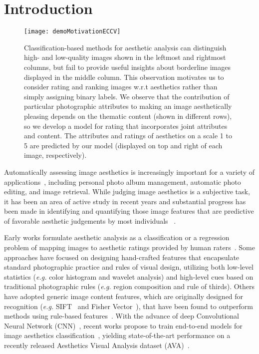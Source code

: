\documentclass[runningheads]{llncs}
\def\eg{\emph{e.g. }}
\begin{document}
\section{Introduction}
\label{sec:intro}

\begin{figure}
\centering
\texttt{[image: demoMotivationECCV]}
\caption{Classification-based methods for aesthetic analysis can distinguish
   high- and low-quality images shown in the leftmost and rightmost columns, but fail to
   provide useful insights about borderline images displayed in the middle column.
   This observation motivates us to consider rating and ranking images w.r.t
   aesthetics rather than simply assigning binary labels. We observe that the
   contribution of particular photographic attributes to making an image
   aesthetically pleasing depends on the thematic content (shown in different
   rows), so we develop a model for rating that incorporates joint
   attributes and content.  The attributes and ratings of aesthetics on a scale 1 to 5
   are predicted by our model (displayed on top and right of each image, respectively).
   }
\vspace{-7mm}
\label{fig:motivation}
\end{figure}

Automatically assessing image aesthetics is increasingly important for a variety of applications~\cite{marchesotti2014discovering,xin2015iccv},
including personal photo album management, automatic photo editing, and image retrieval.
While judging image aesthetics is a subjective task,
it has been an area of active study in recent years and substantial progress has been made
in identifying and quantifying those image features that are predictive of favorable aesthetic judgements by most individuals
~\cite{marchesotti2014discovering,xin2015iccv,lu2014rapid,luo2011content,datta2006studying}.

Early works formulate aesthetic analysis as a classification or a regression
problem of mapping images to aesthetic ratings provided by human
raters~\cite{datta2006studying,ke2006design,luo2011content,dhar2011high,nishiyama2011aesthetic}.
Some approaches have focused on designing hand-crafted features that encapsulate standard
photographic practice and rules of visual design, utilizing both low-level statistics (\eg color histogram and wavelet analysis)
and high-level cues based on traditional photographic rules (\eg region composition and rule of thirds).
Others have adopted generic image content features, which are originally designed
for recognition (\eg SIFT~\cite{lowe2004distinctive} and Fisher
Vector~\cite{perronnin2010improving,perronnin2007fisher}),
that have been found to outperform methods using rule-based features~\cite{marchesotti2011assessing}.
With the advance of deep Convolutional Neural Network (CNN)~\cite{krizhevsky2012imagenet},
recent works propose to train end-to-end models for image aesthetics classification~\cite{kang2014convolutional,lu2014rapid,xin2015iccv},
yielding state-of-the-art performance on a recently released Aesthetics Visual Analysis dataset (AVA)~\cite{murray2012ava}.
\end{document}

